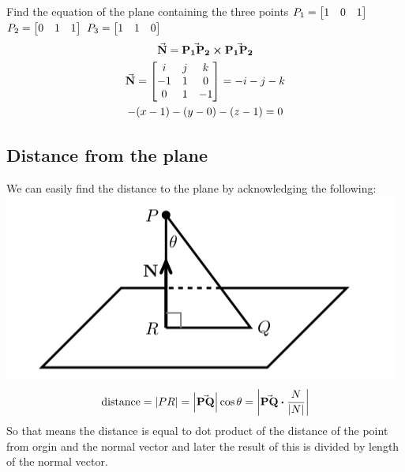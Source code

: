 \documentclass{article}
\begin{document}
    \begin{problem}
        Find the equation of the plane containing the three points $P_1 = \bmqty{1 & 0 & 1}$ $P_2 = \bmqty{0 & 1 & 1}$ $P_3 = \bmqty{1 & 1 & 0}$\\
        \begin{gather*}
            \va{N} = \va{P_1 P_2} \cross \va{P_1 P_2}\\
            \va{N} = \bmqty{i & j & k\\
            -1 & 1 & 0\\
            0 & 1 & -1}
            = -i -j -k\\
            -(x - 1) -(y - 0) -(z-1)=0
        \end{gather*}
    \end{problem}

    \subsection{Distance from the plane}
    We can easily find the distance to the plane by acknowledging the following:\\
    \includegraphics{fig_8.png}
    \begin{gather*}
        \text{distance}=\abs{PR} = \abs{\va{PQ}}\cos{\theta}=\abs{\va{PQ}\vdot\frac{N}{\abs{N}}}\\
    \end{gather*}
    So that means the distance is equal to dot product of the distance of the point from orgin and the normal vector and later the result of this is divided by length of the normal vector.
\end{document}

